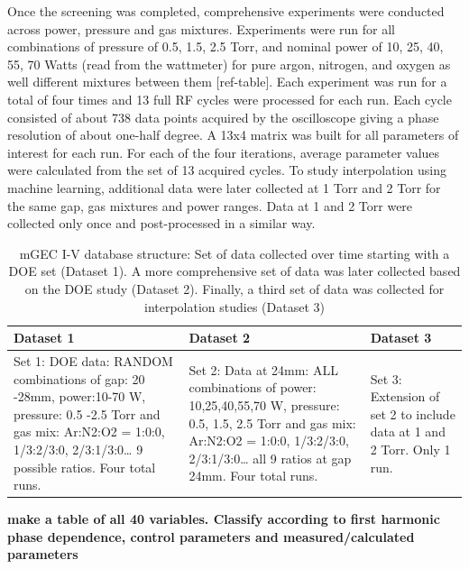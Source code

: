 \documentclass[12pt]{iopart}
\begin{document}
 Once the screening was completed, comprehensive experiments were conducted across power, pressure and gas mixtures. Experiments were run for all combinations of pressure of 0.5, 1.5, 2.5 Torr, and nominal power of 10, 25, 40, 55, 70 Watts (read from the wattmeter) for pure argon, nitrogen, and oxygen as well different mixtures between them [ref-table]. Each experiment was run for a total of four times and 13 full RF cycles were processed for each run. Each cycle consisted of about 738 data points acquired by the oscilloscope giving a phase resolution of about one-half degree. A 13x4 matrix was built for all parameters of interest for each run. For each of the four iterations, average parameter values were calculated from the set of 13 acquired cycles. To study interpolation using machine learning, additional data were later collected at 1 Torr and 2 Torr for the same gap, gas mixtures and power ranges. Data at 1 and 2 Torr were collected only once and post-processed in a similar way.

\begin{table}[]
    \centering
\begin{tabular}{ |p{4cm}|p{4cm}|p{4cm}| }
        \hline
        Dataset 1 & Dataset 2 & Dataset 3 \\
        \hline
        Set 1: DOE data: RANDOM combinations of gap: 20 -28mm, power:10-70 W, pressure: 0.5 -2.5 Torr and gas mix: Ar:N2:O2 = 1:0:0, 1/3:2/3:0, 2/3:1/3:0… 9 possible ratios. Four total runs. & Set 2: Data at 24mm: ALL combinations of power: 10,25,40,55,70 W, pressure: 0.5, 1.5, 2.5 Torr and gas mix: Ar:N2:O2 = 1:0:0, 1/3:2/3:0, 2/3:1/3:0… all 9 ratios at gap 24mm. Four total runs. & Set 3: Extension of set 2 to include data at 1 and 2 Torr. Only 1 run. \\
        \hline
    \end{tabular}
    \caption{mGEC I-V database structure: Set of data collected over time starting with a DOE set (Dataset 1). A more comprehensive set of data was later collected based on the DOE study (Dataset 2). Finally, a third set of data was collected for interpolation studies (Dataset 3)}
    \label{tab:Datasets}
\end{table}


\textbf{make a table of all 40 variables. Classify according to first harmonic phase dependence, control parameters and measured/calculated parameters }\\
\end{document}
